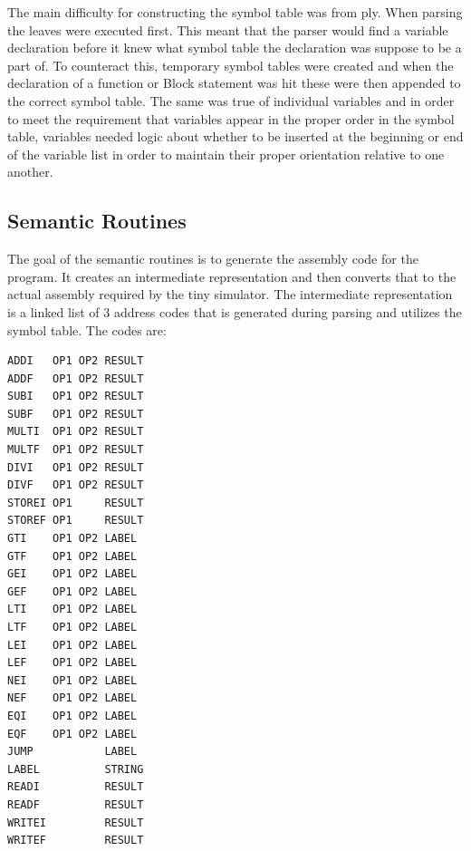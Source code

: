 \documentclass[12pt]{article}
\begin{document}
    		The main difficulty for constructing the symbol table was from ply.  When parsing the leaves were executed first.  This meant that the parser would find a variable declaration before it knew what symbol table the declaration was suppose to be a part of.   To counteract this, temporary symbol tables were created and when the declaration of a function or Block statement was hit these were then appended to the correct symbol table.  The same was true of individual variables and in order to meet the requirement that variables appear in the proper order in the symbol table, variables needed logic about whether to be inserted at the beginning or end of the variable list in order to maintain their proper orientation relative to one another.

    	\subsection{Semantic Routines}
    		The goal of the semantic routines is to generate the assembly code for the program.
            It creates an intermediate representation and then converts that to the actual assembly required by the tiny simulator.
            The intermediate representation is a linked list of 3 address codes that is generated during parsing and utilizes the symbol table.
            The codes are:
            \begin{verbatim}
ADDI   OP1 OP2 RESULT
ADDF   OP1 OP2 RESULT
SUBI   OP1 OP2 RESULT
SUBF   OP1 OP2 RESULT
MULTI  OP1 OP2 RESULT
MULTF  OP1 OP2 RESULT
DIVI   OP1 OP2 RESULT
DIVF   OP1 OP2 RESULT
STOREI OP1     RESULT
STOREF OP1     RESULT
GTI    OP1 OP2 LABEL
GTF    OP1 OP2 LABEL
GEI    OP1 OP2 LABEL
GEF    OP1 OP2 LABEL
LTI    OP1 OP2 LABEL
LTF    OP1 OP2 LABEL
LEI    OP1 OP2 LABEL
LEF    OP1 OP2 LABEL
NEI    OP1 OP2 LABEL
NEF    OP1 OP2 LABEL
EQI    OP1 OP2 LABEL
EQF    OP1 OP2 LABEL
JUMP           LABEL
LABEL          STRING
READI          RESULT
READF          RESULT
WRITEI         RESULT
WRITEF         RESULT
            \end{verbatim}
\end{document}
